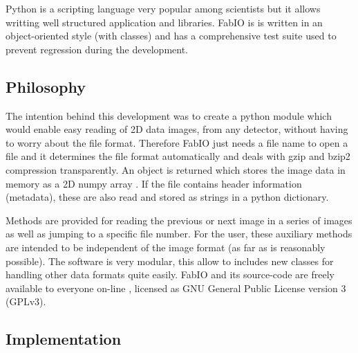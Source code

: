 \documentclass{iucr}
\begin{document}
Python \cite{python} is a scripting language very popular among scientists but
it allows writting well structured application and libraries. FabIO is is
written in an object-oriented style (with classes) and has a comprehensive test suite
used to prevent regression during the development.

\subsection{Philosophy}

The intention behind this development was to create a python module which would enable easy reading
of 2D data images, from any detector, without having to worry about
the file format.
Therefore FabIO just needs a file name to open a file and it determines the
file format automatically and deals with gzip \cite{gzip} and bzip2
\cite{bzip2} compression transparently.
An object is returned which stores the image data in memory as a 2D
numpy array \cite{numpy}.
If the file contains header information (metadata), these are also read and stored
as strings in a python dictionary.

Methods are provided for reading the previous or next image in
a series of images as well as jumping to a specific file number.
For the user, these auxiliary methods are intended to be independent of
the image format (as far as is reasonably possible).
The software is very modular, this allow to includes new classes for handling 
other data formats quite easily. 
FabIO and its source-code are freely available to everyone on-line \cite{fabio}, 
licensed as GNU General Public License version 3 (GPLv3). 

\subsection{Implementation}
\end{document}
